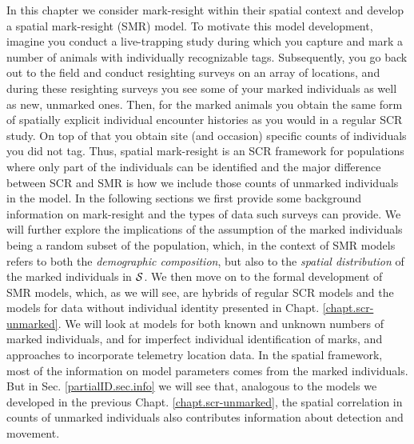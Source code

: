 In this chapter we consider mark-resight within
their %
spatial context and
develop a spatial mark-resight (SMR) model. To motivate this model
development, imagine you conduct a live-trapping study during which
you capture and mark a number of animals with individually
recognizable tags. Subsequently, you go back out to the field and
conduct resighting surveys on an array of locations, and during these
resighting surveys you see some of your marked individuals as well as
new, unmarked ones. Then, for the marked animals you obtain the same
form of spatially explicit individual encounter histories as you would
in a regular SCR study. On top of that you obtain site (and occasion)
specific counts of individuals you did not tag. Thus, spatial
mark-resight is an SCR framework for populations where only part of
the individuals can be identified and the major difference between SCR
and SMR is how we include those counts of unmarked individuals in the
model. In the following sections we first provide some background
information on mark-resight and the types of data such surveys can
provide. We will further explore the implications of the assumption of
the marked individuals being a random subset of the population, which,
in the context of SMR models refers to both the \emph{demographic
  composition}, but also to the \emph{spatial distribution} of the
marked individuals in ${\cal S}$.
We then move on to the formal
development of SMR models,
which, as we will see, are hybrids of regular SCR models and the
models for data without individual identity presented in
Chapt. \ref{chapt.scr-unmarked}. We will look at models for
both known and unknown numbers of marked individuals, and for
imperfect individual identification of marks, and approaches to incorporate telemetry location data. In the spatial
framework, most of the information on model parameters comes from the
marked individuals. But in Sec. \ref{partialID.sec.info} we will see
that, analogous to the models we developed in the previous
Chapt. \ref{chapt.scr-unmarked}, the spatial correlation in counts of
unmarked individuals also contributes information about detection and
movement.

